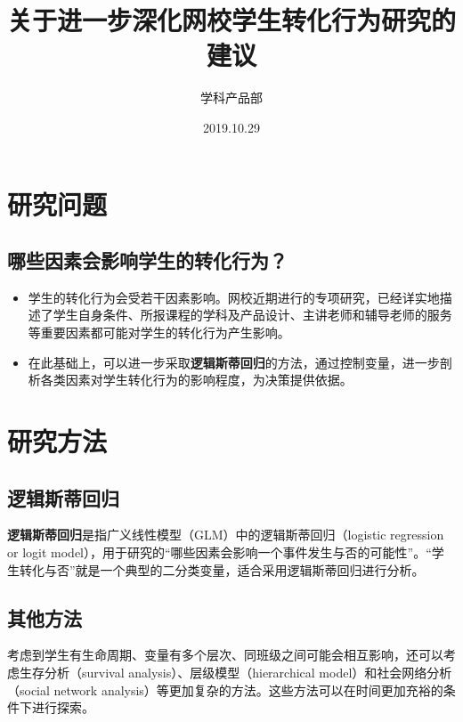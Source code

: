\documentclass[]{article}
\title{关于进一步深化网校学生转化行为研究的建议}
\author{学科产品部}
\date{2019.10.29}
\begin{document}
\maketitle

\section{研究问题}\label{ux7814ux7a76ux95eeux9898}

\subsection{\texorpdfstring{哪些因素会影响学生的\textbf{转化}行为？}{哪些因素会影响学生的转化行为？}}\label{ux54eaux4e9bux56e0ux7d20ux4f1aux5f71ux54cdux5b66ux751fux7684ux8f6cux5316ux884cux4e3a}

\begin{itemize}
\item
  学生的转化行为会受若干因素影响。网校近期进行的专项研究，已经详实地描述了学生自身条件、所报课程的学科及产品设计、主讲老师和辅导老师的服务等重要因素都可能对学生的转化行为产生影响。
\item
  在此基础上，可以进一步采取\textbf{逻辑斯蒂回归}的方法，通过控制变量，进一步剖析各类因素对学生转化行为的影响程度，为决策提供依据。
\end{itemize}

\section{研究方法}\label{ux7814ux7a76ux65b9ux6cd5}

\subsection{逻辑斯蒂回归}\label{ux903bux8f91ux65afux8482ux56deux5f52}

\textbf{逻辑斯蒂回归}是指广义线性模型（GLM）中的逻辑斯蒂回归（logistic
regression or logit
model），用于研究的``哪些因素会影响一个事件发生与否的可能性''。``学生转化与否''就是一个典型的二分类变量，适合采用逻辑斯蒂回归进行分析。

\subsection{其他方法}\label{ux5176ux4ed6ux65b9ux6cd5}

考虑到学生有生命周期、变量有多个层次、同班级之间可能会相互影响，还可以考虑生存分析（survival
analysis）、层级模型（hierarchical model）和社会网络分析（social network
analysis）等更加复杂的方法。这些方法可以在时间更加充裕的条件下进行探索。
\end{document}
